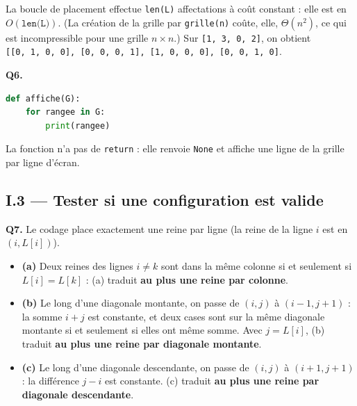 \documentclass[11pt,a4paper]{article}
\providecommand{\tightlist}{\setlength{\itemsep}{0pt}\setlength{\parskip}{0pt}}
\begin{document}
La boucle de placement effectue \texttt{len(L)} affectations à coût constant : elle est en \(O(\texttt{len(L)})\). (La création de la grille par \texttt{grille(n)} coûte, elle, \(\Theta(n^2)\), ce qui est incompressible pour une grille \(n \times n\).) Sur \texttt{{[}1,\ 3,\ 0,\ 2{]}}, on obtient \texttt{{[}{[}0,\allowbreak{}\ 1,\allowbreak{}\ 0,\allowbreak{}\ 0{]}\allowbreak{},\allowbreak{}\ {[}0,\allowbreak{}\ 0,\allowbreak{}\ 0,\allowbreak{}\ 1{]}\allowbreak{},\allowbreak{}\ {[}1,\allowbreak{}\ 0,\allowbreak{}\ 0,\allowbreak{}\ 0{]}\allowbreak{},\allowbreak{}\ {[}0,\allowbreak{}\ 0,\allowbreak{}\ 1,\allowbreak{}\ 0{]}\allowbreak{}{]}\allowbreak{}}.

\textbf{Q6.}

\begin{lstlisting}[language=Python]
def affiche(G):
    for rangee in G:
        print(rangee)
\end{lstlisting}

La fonction n'a pas de \texttt{return} : elle renvoie \texttt{None} et affiche une ligne de la grille par ligne d'écran.

\hypertarget{i.3-tester-si-une-configuration-est-valide}{%
\subsection{I.3 --- Tester si une configuration est valide}\label{i.3-tester-si-une-configuration-est-valide}}

\textbf{Q7.} Le codage place exactement une reine par ligne (la reine de la ligne \(i\) est en \((i, L[i])\)).

\begin{itemize}
\tightlist
\item
  \textbf{(a)} Deux reines des lignes \(i \neq k\) sont dans la même colonne si et seulement si \(L[i] = L[k]\) : (a) traduit \textbf{au plus une reine par colonne}.
\item
  \textbf{(b)} Le long d'une diagonale montante, on passe de \((i, j)\) à \((i-1, j+1)\) : la somme \(i + j\) est constante, et deux cases sont sur la même diagonale montante si et seulement si elles ont même somme. Avec \(j = L[i]\), (b) traduit \textbf{au plus une reine par diagonale montante}.
\item
  \textbf{(c)} Le long d'une diagonale descendante, on passe de \((i, j)\) à \((i+1, j+1)\) : la différence \(j - i\) est constante. (c) traduit \textbf{au plus une reine par diagonale descendante}.
\end{itemize}
\end{document}
